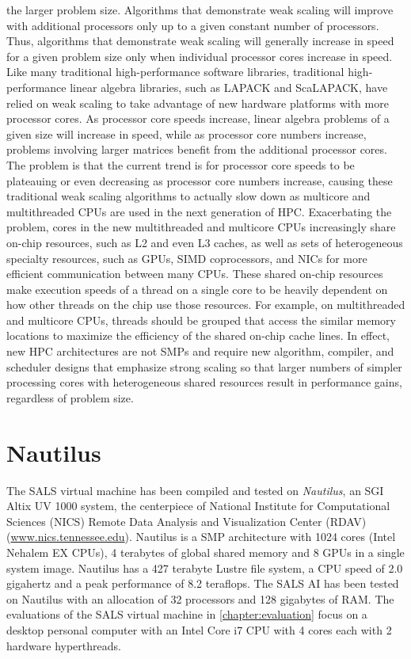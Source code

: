 the larger problem size.  Algorithms that demonstrate weak scaling
will improve with additional processors only up to a given constant
number of processors.  Thus, algorithms that demonstrate weak scaling
will generally increase in speed for a given problem size only when
individual processor cores increase in speed.  Like many traditional
high-performance software libraries, traditional high-performance
linear algebra libraries, such as LAPACK and ScaLAPACK, have relied on
weak scaling to take advantage of new hardware platforms with more
processor cores.  As processor core speeds increase, linear algebra
problems of a given size will increase in speed, while as processor
core numbers increase, problems involving larger matrices benefit from
the additional processor cores.  The problem is that the current trend
is for processor core speeds to be plateauing or even decreasing as
processor core numbers increase, causing these traditional weak
scaling algorithms to actually slow down as multicore and
multithreaded CPUs are used in the next generation of HPC.
Exacerbating the problem, cores in the new multithreaded and multicore
CPUs increasingly share on-chip resources, such as L2 and even L3
caches, as well as sets of heterogeneous specialty resources, such as
GPUs, SIMD coprocessors, and NICs for more efficient communication
between many CPUs.  These shared on-chip resources make execution
speeds of a thread on a single core to be heavily dependent on how
other threads on the chip use those resources.  For example, on
multithreaded and multicore CPUs, threads should be grouped that
access the similar memory locations to maximize the efficiency of the
shared on-chip cache lines.  In effect, new HPC architectures are not
SMPs and require new algorithm, compiler, and scheduler designs that
emphasize strong scaling so that larger numbers of simpler processing
cores with heterogeneous shared resources result in performance gains,
regardless of problem size.

\section{Nautilus}

The SALS virtual machine has been compiled and tested on
{\emph{Nautilus}}, an SGI Altix UV 1000 system, the centerpiece of
National Institute for Computational Sciences (NICS) Remote Data
Analysis and Visualization Center (RDAV)
(\url{www.nics.tennessee.edu}).  Nautilus is a SMP architecture with
1024 cores (Intel Nehalem EX CPUs), 4 terabytes of global shared
memory and 8 GPUs in a single system image.  Nautilus has a 427
terabyte Lustre file system, a CPU speed of 2.0 gigahertz and a peak
performance of 8.2 teraflops.  The SALS AI has been tested on Nautilus
with an allocation of 32 processors and 128 gigabytes of RAM.  The
evaluations of the SALS virtual machine in
{\mbox{\autoref{chapter:evaluation}}} focus on a desktop personal
computer with an Intel Core i7 CPU with 4 cores each with 2 hardware
hyperthreads.


